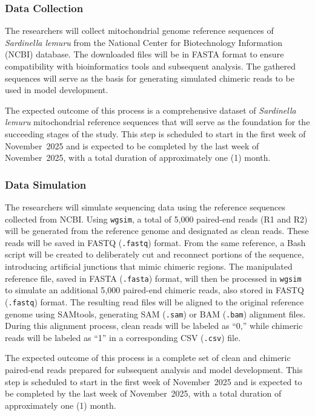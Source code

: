 \subsubsection{Data Collection}

The researchers will collect mitochondrial genome reference sequences of \textit{Sardinella lemuru} from the National Center for Biotechnology Information (NCBI) database. The downloaded files will be in FASTA format to ensure compatibility with bioinformatics tools and subsequent analysis. The gathered sequences will serve as the basis for generating simulated chimeric reads to be used in model development.

The expected outcome of this process is a comprehensive dataset of \textit{Sardinella lemuru} mitochondrial reference sequences that will serve as the foundation for the succeeding stages of the study. This step is scheduled to start in the first week of November~2025 and is expected to be completed by the last week of November~2025, with a total duration of approximately one (1) month.

\subsubsection{Data Simulation}

The researchers will simulate sequencing data using the reference sequences collected from NCBI. Using \texttt{wgsim}, a total of 5{,}000 paired-end reads (R1 and R2) will be generated from the reference genome and designated as clean reads. These reads will be saved in FASTQ (\texttt{.fastq}) format. From the same reference, a Bash script will be created to deliberately cut and reconnect portions of the sequence, introducing artificial junctions that mimic chimeric regions. The manipulated reference file, saved in FASTA (\texttt{.fasta}) format, will then be processed in \texttt{wgsim} to simulate an additional 5{,}000 paired-end chimeric reads, also stored in FASTQ (\texttt{.fastq}) format. The resulting read files will be aligned to the original reference genome using SAMtools, generating SAM (\texttt{.sam}) or BAM (\texttt{.bam}) alignment files. During this alignment process, clean reads will be labeled as ``0,'' while chimeric reads will be labeled as ``1'' in a corresponding CSV (\texttt{.csv}) file.

The expected outcome of this process is a complete set of clean and chimeric paired-end reads prepared for subsequent analysis and model development. This step is scheduled to start in the first week of November~2025 and is expected to be completed by the last week of November~2025, with a total duration of approximately one (1) month.

